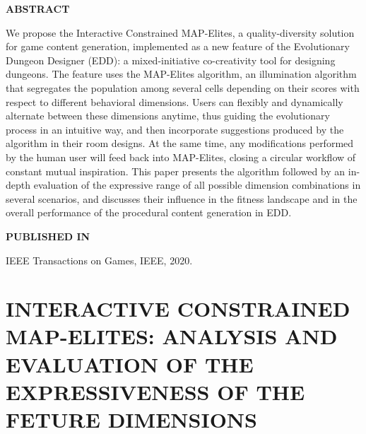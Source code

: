 \graphicspath{{included-papers-tex/paper-6/}}



\normalfont
\textbf{\textsc{ABSTRACT}}

We propose the Interactive Constrained MAP-Elites, a quality-diversity solution for game content generation, implemented as a new feature of the Evolutionary Dungeon Designer (EDD): a mixed-initiative co-creativity tool for designing dungeons. The feature uses the MAP-Elites algorithm, an illumination algorithm that segregates the population among several cells depending on their scores with respect to different behavioral dimensions. Users can flexibly and dynamically alternate between these dimensions anytime, thus guiding the evolutionary process in an intuitive way, and then incorporate suggestions produced by the algorithm in their room designs. At the same time, any modifications performed by the human user will feed back into MAP-Elites, closing a circular workflow of constant mutual inspiration. This paper presents the algorithm followed by an in-depth %
evaluation of the expressive range of all possible dimension combinations in several scenarios, %
and discusses their influence in the fitness landscape and in the overall performance of the %
procedural content generation in EDD.

\textbf{\textsc{PUBLISHED IN}}

IEEE Transactions on Games, IEEE, 2020.

\section*{INTERACTIVE CONSTRAINED MAP-ELITES: ANALYSIS AND EVALUATION OF THE EXPRESSIVENESS OF THE FETURE DIMENSIONS}




% 

% 



